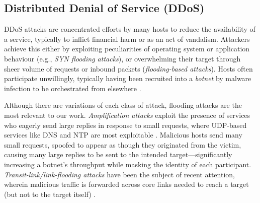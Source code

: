 \documentclass[conference, letterpaper, 10pt, times]{IEEEtran}
\begin{document}


\subsection{Distributed Denial of Service (DDoS)}


DDoS attacks are concentrated efforts by many hosts to reduce the availability of a service, typically to inflict financial harm or as an act of vandalism.
Attackers achieve this either by exploiting peculiarities of operating system or application behaviour (e.g., \emph{SYN flooding attacks}), or overwhelming their target through sheer volume of requests or inbound packets (\emph{flooding-based attacks}).
Hosts often participate unwillingly, typically having been recruited into a \emph{botnet} by malware infection to be orchestrated from elsewhere \cite{DBLP:conf/uss/AntonakakisABBB17}.

Although there are variations of each class of attack, flooding attacks are the most relevant to our work.
\emph{Amplification attacks} exploit the presence of services who eagerly send large replies in response to small requests, where UDP-based services like DNS and NTP are most exploitable \cite{DBLP:conf/ndss/Rossow14, DBLP:conf/uss/KuhrerHRH14}.
Malicious hosts send many small requests, spoofed to appear as though they originated from the victim, causing many large replies to be sent to the intended target---significantly increasing a botnet's throughput while masking the identity of each participant.
\emph{Transit-link/link-flooding attacks} have been the subject of recent attention, wherein malicious traffic is forwarded across core links needed to reach a target (but not to the target itself) \cite{DBLP:conf/sp/KangLG13, DBLP:conf/esorics/StuderP09}.
\end{document}
